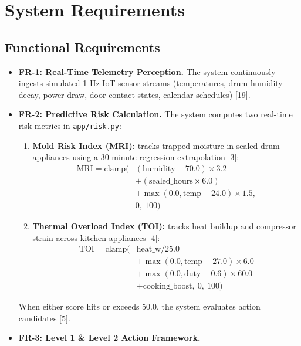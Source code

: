 \documentclass[conference]{IEEEtran}
\begin{document}
\section{System Requirements}

\subsection{Functional Requirements}
\begin{itemize}
  \item \textbf{FR-1: Real-Time Telemetry Perception.} The system continuously
  ingests simulated 1 Hz IoT sensor streams (temperatures, drum humidity decay,
  power draw, door contact states, calendar schedules) [19].
  \item \textbf{FR-2: Predictive Risk Calculation.} The system computes two
  real-time risk metrics in \texttt{app/risk.py}:
  \begin{enumerate}
    \item \textbf{Mold Risk Index (MRI):} tracks trapped moisture in sealed drum
    appliances using a 30-minute regression extrapolation [3]:
    \begin{equation*}
    \begin{split}
      \mathrm{MRI} = \mathrm{clamp}\big(&(\text{humidity}-70.0)\times 3.2\\
        &+ (\text{sealed\_hours}\times 6.0)\\
        &+ \max(0.0, \text{temp}-24.0)\times 1.5,\\
        &0,\ 100\big)
    \end{split}
    \end{equation*}
    \item \textbf{Thermal Overload Index (TOI):} tracks heat buildup and
    compressor strain across kitchen appliances [4]:
    \begin{equation*}
    \begin{split}
      \mathrm{TOI} = \mathrm{clamp}\big(&\text{heat\_w}/25.0\\
        &+ \max(0.0, \text{temp}-27.0)\times 6.0\\
        &+ \max(0.0, \text{duty}-0.6)\times 60.0\\
        &+ \text{cooking\_boost},\ 0,\ 100\big)
    \end{split}
    \end{equation*}
  \end{enumerate}
  When either score hits or exceeds 50.0, the system evaluates action candidates
  [5].
  \item \textbf{FR-3: Level 1 \& Level 2 Action Framework.}

\end{itemize}
\end{document}
